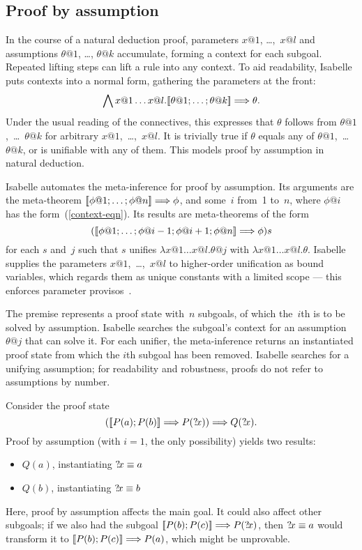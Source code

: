 \subsection{Proof by assumption}
In the course of a natural deduction proof, parameters $x@1$, \ldots,~$x@l$ and
assumptions $\theta@1$, \ldots, $\theta@k$ accumulate, forming a context for
each subgoal. Repeated lifting steps can lift a rule into any context. To
aid readability, Isabelle puts contexts into a normal form, gathering the
parameters at the front:
\begin{equation}
    \label{context-eqn}
    \Forall x@1 \ldots x@l. \List{\theta@1; \ldots; \theta@k}\Imp\theta.
\end{equation}
Under the usual reading of the connectives, this expresses that $\theta$
follows from $\theta@1$,~\ldots~$\theta@k$ for arbitrary
$x@1$,~\ldots,~$x@l$. It is trivially true if $\theta$ equals any of
$\theta@1$,~\ldots~$\theta@k$, or is unifiable with any of them. This
models proof by assumption in natural deduction.

Isabelle automates the meta-inference for proof by assumption. Its arguments
are the meta-theorem $\List{\phi@1; \ldots; \phi@n} \Imp \phi$, and some~$i$
from~1 to~$n$, where $\phi@i$ has the form~(\ref{context-eqn}). Its results
are meta-theorems of the form
\[ (\List{\phi@1; \ldots; \phi@{i-1}; \phi@{i+1}; \phi@n} \Imp \phi)s \]
for each $s$ and~$j$ such that $s$ unifies $\lambda x@1 \ldots x@l. \theta@j$
with $\lambda x@1 \ldots x@l. \theta$. Isabelle supplies the parameters
$x@1$,~\ldots,~$x@l$ to higher-order unification as bound variables, which
regards them as unique constants with a limited scope --- this enforces
parameter provisos~\cite{paulson-found}.

The premise represents a proof state with~$n$ subgoals, of which the~$i$th
is to be solved by assumption. Isabelle searches the subgoal's context for
an assumption~$\theta@j$ that can solve it. For each unifier, the
meta-inference returns an instantiated proof state from which the $i$th
subgoal has been removed. Isabelle searches for a unifying assumption; for
readability and robustness, proofs do not refer to assumptions by number.

Consider the proof state
\[ (\mathopen{[\![} P(a); P(b)\mathclose{]\!]} \Longrightarrow P({?\!x})) \Longrightarrow Q({?\!x}). \]
Proof by assumption (with $i=1$, the only possibility) yields two results:
\begin{itemize}
    \item $Q(a)$, instantiating ${?\!x}\equiv a$
    \item $Q(b)$, instantiating ${?\!x}\equiv b$
\end{itemize}
Here, proof by assumption affects the main goal. It could also affect
other subgoals; if we also had the subgoal ${\mathopen{[\![} P(b); P(c)\mathclose{]\!]} \Longrightarrow
P({?\!x})}$, then ${?\!x}\equiv a$ would transform it to ${\mathopen{[\![} P(b);
P(c)\mathclose{]\!]} \Longrightarrow P(a)}$, which might be unprovable.

